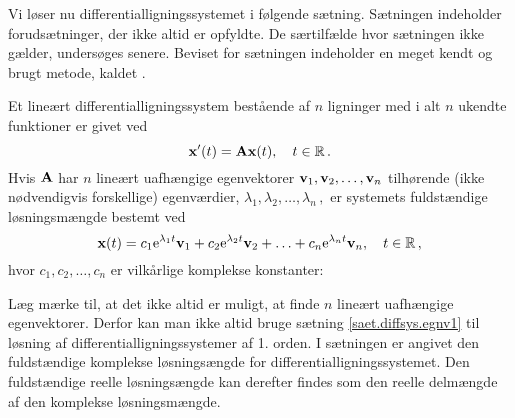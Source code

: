 Vi løser nu differentialligningssystemet i følgende sætning. Sætningen indeholder forudsætninger, der ikke altid er opfyldte. De særtilfælde hvor sætningen ikke gælder, undersøges senere. Beviset for sætningen indeholder en meget kendt og brugt metode, kaldet .

\begin{theorem} \label{saet.diffsys.egnv1}
Et lineært differentialligningssystem bestående af $ n $ ligninger med i alt $ n $ ukendte funktioner er givet ved
\begin{equation} \label{lig.saet.difflig1}
\mathbf{x}'(t) = \mathbf{A} \mathbf{x}(t), \quad t \in \mathbb{R} \,. 
\end{equation} 
Hvis $ \mathbf{A} $ har $ n $ lineært uafhængige egenvektorer $ \mathbf{v} _1, \mathbf{v} _2, \ldots, \mathbf{v} _n $ tilhørende (ikke nødvendigvis forskellige) egenværdier, $ \lambda_1, \lambda_2, \ldots, \lambda_n \,,$ er systemets fuldstændige løsningsmængde bestemt ved 
\begin{equation} \label{fuldKomplSol}
\mathbf{x}(t) = c_1 \mathrm{e}^{\lambda_1 t} \mathbf{v}_1 + c_2 \mathrm{e}^{\lambda_2 t} \mathbf{v}_2 + \ldots + c_n \mathrm{e}^{\lambda_n t} \mathbf{v}_n, \quad t \in \mathbb{R}\,,
\end{equation}
hvor $ c_1, c_2, \ldots, c_n $ er vilkårlige komplekse konstanter:

\end{theorem}

\begin{obs}
Læg mærke til, at det ikke altid er muligt, at finde $ n $ lineært uafhængige egenvektorer. Derfor kan man ikke altid bruge sætning \ref{saet.diffsys.egnv1} til løsning af differentialligningssystemer af 1. orden. %
\bs
I sætningen er angivet den fuldstændige komplekse løsningsængde for differentialligningssystemet. Den fuldstændige reelle løsningsængde kan derefter findes som den reelle delmængde af den komplekse løsningsmængde. 
\end{obs}


